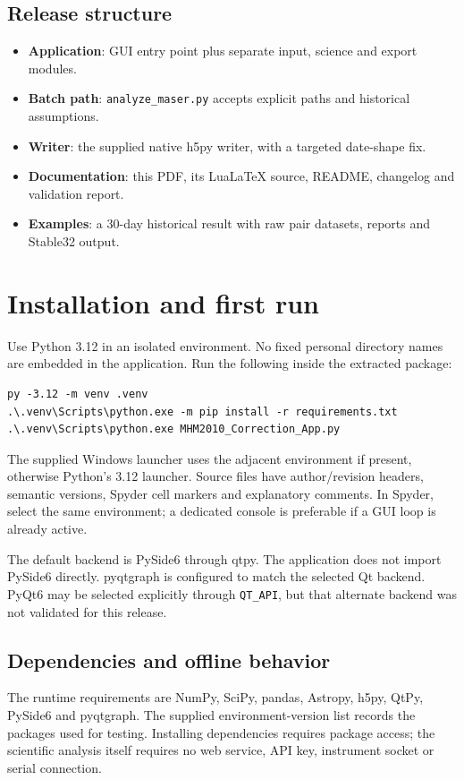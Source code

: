 \documentclass[11pt,a4paper]{article}
\begin{document}
\subsection{Release structure}
\begin{itemize}
\item \textbf{Application}: GUI entry point plus separate input, science and export modules.
\item \textbf{Batch path}: \texttt{analyze\_maser.py} accepts explicit paths and historical assumptions.
\item \textbf{Writer}: the supplied native h5py writer, with a targeted date-shape fix.
\item \textbf{Documentation}: this PDF, its LuaLaTeX source, README, changelog and validation report.
\item \textbf{Examples}: a 30-day historical result with raw pair datasets, reports and Stable32 output.
\end{itemize}
\clearpage

\section{Installation and first run}
Use Python 3.12 in an isolated environment. No fixed personal directory names
are embedded in the application. Run the following inside the extracted package:
\begin{lstlisting}
py -3.12 -m venv .venv
.\.venv\Scripts\python.exe -m pip install -r requirements.txt
.\.venv\Scripts\python.exe MHM2010_Correction_App.py
\end{lstlisting}

The supplied Windows launcher uses the adjacent environment if present,
otherwise Python's 3.12 launcher. Source files have author/revision headers,
semantic versions, Spyder cell markers and explanatory comments. In Spyder,
select the same environment; a dedicated console is preferable if a GUI loop
is already active.

The default backend is PySide6 through qtpy. The application does not import
PySide6 directly. pyqtgraph is configured to match the selected Qt backend.
PyQt6 may be selected explicitly through \texttt{QT\_API}, but that alternate
backend was not validated for this release.

\subsection{Dependencies and offline behavior}
The runtime requirements are NumPy, SciPy, pandas, Astropy, h5py, QtPy,
PySide6 and pyqtgraph. The supplied environment-version list records the
packages used for testing. Installing dependencies requires package access;
the scientific analysis itself requires no web service, API key, instrument
socket or serial connection.
\end{document}
